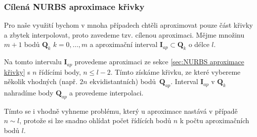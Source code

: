 \subsubsection{Cílená NURBS aproximace křivky}
Pro naše využití bychom v mnoha případech chtěli aproximovat pouze část křivky
a zbytek interpolovat, proto zavedeme tzv. cílenou aproximaci. Mějme množinu $m
    + 1$ bodů $\bm{Q}_k$ $k = 0, \ldots, m$ a aproximační interval $\bm{I}_{ap}
    \subset \bm{Q}_k$ o délce $l$.\par Na tomto intervalu $\bm{I}_{ap}$ provedeme
aproximaci ze sekce \ref{sec:NURBS aproximace křivky} s $n$ řídícími body, $n
    \le l - 2$. Tímto získáme křivku, ze které vybereme několik vhodných (např.
$2n$ ekvidistantních) bodů~$\bm{Q}_{ap}$. Interval $\bm{I}_{ap}$ v $\bm{Q}_k$
nahradíme body $\bm{Q}_{ap}$ a provedeme interpolaci. \par Tímto se i vhodně
vyhneme problému, který u aproximace nastává v případě $n \sim l$, protože si
lze snadno ohlídat počet řídících bodů $n$ k počtu aproximačních bodů $l$.
